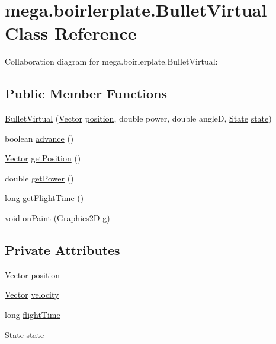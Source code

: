 \hypertarget{classmega_1_1boirlerplate_1_1_bullet_virtual}{}\section{mega.\+boirlerplate.\+Bullet\+Virtual Class Reference}
\label{classmega_1_1boirlerplate_1_1_bullet_virtual}


Collaboration diagram for mega.\+boirlerplate.\+Bullet\+Virtual\+:
\subsection*{Public Member Functions}
\begin{DoxyCompactItemize}
\item 
\hyperlink{classmega_1_1boirlerplate_1_1_bullet_virtual_aaceb4297f10125dd1770677bcf96727c}{Bullet\+Virtual} (\hyperlink{classmega_1_1boirlerplate_1_1_vector}{Vector} \hyperlink{classmega_1_1boirlerplate_1_1_bullet_virtual_ab2655e20269fecca0a08a1ecd2df21f2}{position}, double power, double angleD, \hyperlink{classmega_1_1boirlerplate_1_1_state}{State} \hyperlink{classmega_1_1boirlerplate_1_1_bullet_virtual_a33a2ae89b8b0a33af3c67098911061b9}{state})
\item 
boolean \hyperlink{classmega_1_1boirlerplate_1_1_bullet_virtual_a819d02c4c82ced2c21a77d79e0cfa603}{advance} ()
\item 
\hyperlink{classmega_1_1boirlerplate_1_1_vector}{Vector} \hyperlink{classmega_1_1boirlerplate_1_1_bullet_virtual_a783ad83c584a2f888b84eee0a65d0351}{get\+Position} ()
\item 
double \hyperlink{classmega_1_1boirlerplate_1_1_bullet_virtual_a933676dd4ece6ed22e47d75a8fc5cc67}{get\+Power} ()
\item 
long \hyperlink{classmega_1_1boirlerplate_1_1_bullet_virtual_ae3d0a123374d39d056414c0916bff3c6}{get\+Flight\+Time} ()
\item 
void \hyperlink{classmega_1_1boirlerplate_1_1_bullet_virtual_adb7ec37f1daf7368070539f97cfe307d}{on\+Paint} (Graphics2D g)
\end{DoxyCompactItemize}
\subsection*{Private Attributes}
\begin{DoxyCompactItemize}
\item 
\hyperlink{classmega_1_1boirlerplate_1_1_vector}{Vector} \hyperlink{classmega_1_1boirlerplate_1_1_bullet_virtual_ab2655e20269fecca0a08a1ecd2df21f2}{position}
\item 
\hyperlink{classmega_1_1boirlerplate_1_1_vector}{Vector} \hyperlink{classmega_1_1boirlerplate_1_1_bullet_virtual_aaa40ceea08e91f514a0028fa4256f757}{velocity}
\item 
long \hyperlink{classmega_1_1boirlerplate_1_1_bullet_virtual_a2030df7e278f60da85e67a0f0158171f}{flight\+Time}
\item 
\hyperlink{classmega_1_1boirlerplate_1_1_state}{State} \hyperlink{classmega_1_1boirlerplate_1_1_bullet_virtual_a33a2ae89b8b0a33af3c67098911061b9}{state}
\end{DoxyCompactItemize}


